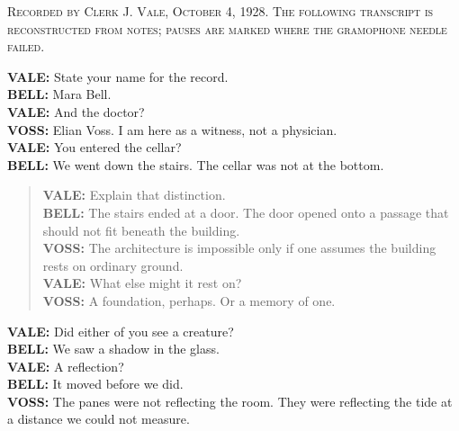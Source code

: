 \textsc{Recorded by Clerk J. Vale, October 4, 1928. The following transcript
is reconstructed from notes; pauses are marked where the gramophone needle
failed.}

\medskip
\noindent\textbf{VALE:} State your name for the record.\\
\textbf{BELL:} Mara Bell.\\
\textbf{VALE:} And the doctor?\\
\textbf{VOSS:} Elian Voss. I am here as a witness, not a physician.\\
\textbf{VALE:} You entered the cellar?\\
\textbf{BELL:} We went down the stairs. The cellar was not at the bottom.

\begin{quote}
\textbf{VALE:} Explain that distinction.\\
\textbf{BELL:} The stairs ended at a door. The door opened onto a passage
that should not fit beneath the building.\\
\textbf{VOSS:} The architecture is impossible only if one assumes the
building rests on ordinary ground.\\
\textbf{VALE:} What else might it rest on?\\
\textbf{VOSS:} A foundation, perhaps. Or a memory of one.
\end{quote}

\textbf{VALE:} Did either of you see a creature?\\
\textbf{BELL:} We saw a shadow in the glass.\\
\textbf{VALE:} A reflection?\\
\textbf{BELL:} It moved before we did.\\
\textbf{VOSS:} The panes were not reflecting the room. They were reflecting
the tide at a distance we could not measure.
